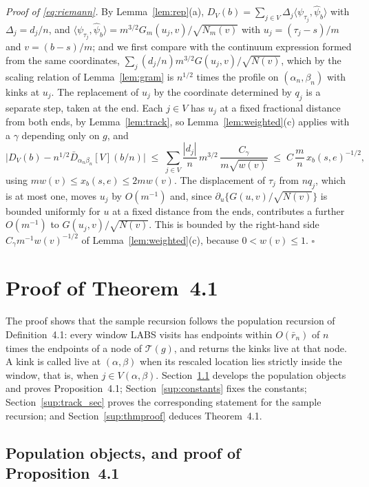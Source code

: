 \documentclass[12pt, a4paper]{article}
\newcommand{\qed}{\hfill$\square$}
\newenvironment{proof}[1][Proof]{\par\noindent\textit{#1.}\space}{\qed\par\medskip}
\newcommand{\mainthm}{Theorem~4.1}
\newcommand{\defpop}{Definition~4.1}
\newcommand{\proppop}{Proposition~4.1}
\begin{document}
\begin{proof}[Proof of \eqref{eq:riemann}]
By Lemma~\ref{lem:rep}(a), $D_V(b) = \sum_{j \in V}\Delta_j
\langle\psi_{\tau_j},\hat\psi_b\rangle$ with $\Delta_j = d_j/n$, and
$\langle\psi_{\tau_j},\hat\psi_b\rangle = m^{3/2} G_m(u_j,v)/\sqrt{N_m(v)}$
with $u_j = (\tau_j-s)/m$ and $v = (b-s)/m$; and we first compare with the continuum expression formed from the same coordinates, $\sum_j (d_j/n)m^{3/2}G(u_j,v)/\sqrt{N(v)}$, which by the scaling relation of Lemma~\ref{lem:gram} is $n^{1/2}$ times the profile on $(\alpha_n,\beta_n)$ with kinks at $u_j$. The replacement of $u_j$ by the coordinate determined by $q_j$ is a separate step, taken at the end. Each
$j \in V$ has $u_j$ at a fixed fractional distance from both ends, by
Lemma~\ref{lem:track}, so Lemma~\ref{lem:weighted}(c) applies with a
$\gamma$ depending only on $g$, and
\[
\big| D_V(b) - n^{1/2}\bar D_{\alpha_n\beta_n}[V](b/n) \big|
\;\le\; \sum_{j \in V} \frac{|d_j|}{n}\, m^{3/2}\,
\frac{C_\gamma}{m\sqrt{w(v)}}
\;\le\; C\,\frac{m}{n}\, x_b(s,e)^{-1/2} ,
\]
using $m w(v) \le x_b(s,e) \le 2m w(v)$. The displacement of $\tau_j$ from
$nq_j$, which is at most one, moves $u_j$ by $O(m^{-1})$ and, since
$\partial_u\{G(u,v)/\sqrt{N(v)}\}$ is bounded uniformly for $u$ at a fixed
distance from the ends, contributes a further $O(m^{-1})$ to
$G(u_j,v)/\sqrt{N(v)}$. This is bounded by the right-hand side
$C_\gamma m^{-1}w(v)^{-1/2}$ of Lemma~\ref{lem:weighted}(c), because
$0<w(v)\le1$.
\end{proof}



\section{Proof of \mainthm{}}
\label{sup:proof}

The proof shows that the sample recursion follows the population recursion of \defpop{}: every window LABS visits has endpoints within $O(\bar r_n)$ of $n$ times the endpoints of a node of $\mathcal{T}(g)$, and returns the kinks live at that node. A kink is called live at $(\alpha,\beta)$ when its rescaled location lies strictly inside the window, that is, when $j\in V(\alpha,\beta)$. Section~\ref{sup:pop_proof}
develops the population objects and proves \proppop{};
Section~\ref{sup:constants} fixes the constants;
Section~\ref{sup:track_sec} proves the corresponding statement for the sample recursion; and
Section~\ref{sup:thmproof} deduces \mainthm{}.

\subsection{Population objects, and proof of \proppop{}}
\label{sup:pop_proof}
\end{document}

